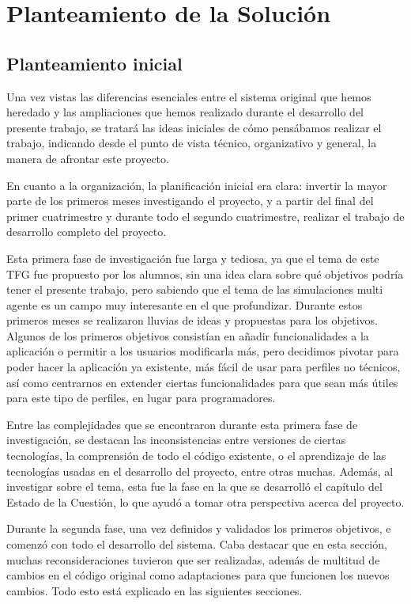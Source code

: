 \chapter{Planteamiento de la Solución}
\label{cap:planteamiento}
\section{Planteamiento inicial}

Una vez vistas las diferencias esenciales entre el sistema original que hemos heredado y las ampliaciones que hemos realizado durante el desarrollo del presente trabajo, se tratará las ideas iniciales de cómo pensábamos realizar el trabajo, indicando desde el punto de vista técnico, organizativo y general, la manera de afrontar este proyecto.

En cuanto a la organización, la planificación inicial era clara: invertir la mayor parte de los primeros meses investigando el proyecto, y a partir del final del primer cuatrimestre y durante todo el segundo cuatrimestre, realizar el trabajo de desarrollo completo del proyecto.

Esta primera fase de investigación fue larga y tediosa, ya que el tema de este TFG fue propuesto por los alumnos, sin una idea clara sobre qué objetivos podría tener el presente trabajo, pero sabiendo que el tema de las simulaciones multi agente es un campo muy interesante en el que profundizar. Durante estos primeros meses se realizaron lluvias de ideas y propuestas para los objetivos. Algunos de los primeros objetivos consistían en añadir funcionalidades a la aplicación o permitir a los usuarios modificarla más, pero decidimos pivotar para poder hacer la aplicación ya existente, más fácil de usar para perfiles no técnicos, así como centrarnos en extender ciertas funcionalidades para que sean más útiles para este tipo de perfiles, en lugar para programadores.

Entre las complejidades que se encontraron durante esta primera fase de investigación, se destacan las inconsistencias entre versiones de ciertas tecnologías, la comprensión de todo el código existente, o el aprendizaje de las tecnologías usadas en el desarrollo del proyecto, entre otras muchas. Además, al investigar sobre el tema, esta fue la fase en la que se desarrolló el capítulo del Estado de la Cuestión, lo que ayudó a tomar otra perspectiva acerca del proyecto.

Durante la segunda fase, una vez definidos y validados los primeros objetivos, e comenzó con todo el desarrollo del sistema. Caba destacar que en esta sección, muchas reconsideraciones tuvieron que ser realizadas, además de multitud de cambios en el código original como adaptaciones para que funcionen los nuevos cambios. Todo esto está explicado en las siguientes secciones.

